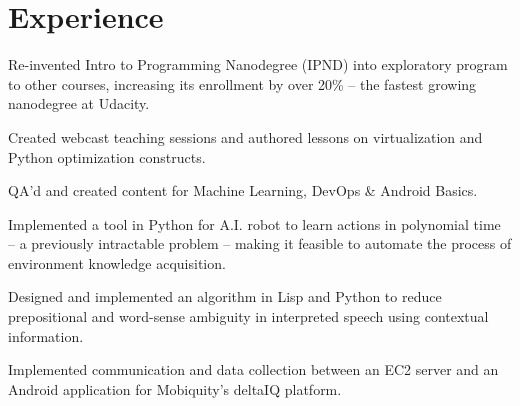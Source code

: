 \documentclass[]{deedy-resume-openfont}
\begin{document}
\hfill
\begin{minipage}[t]{0.66\textwidth} 


\section{Experience}

\vspace{\topsep} %
\begin{tightemize}

\item Re-invented Intro to Programming Nanodegree (IPND) into exploratory program to other courses, increasing its enrollment by over 20\% -- the fastest growing nanodegree at Udacity.

\item Created webcast teaching sessions and authored lessons on virtualization and Python optimization constructs.

\item QA'd and created content for Machine Learning, DevOps \& Android Basics.

\end{tightemize}
\sectionsep

\begin{tightemize}
\item Implemented a tool in Python for A.I. robot to learn actions in polynomial time -- a previously intractable problem -- making it feasible to automate the process of environment knowledge acquisition.

\item Designed and implemented an algorithm in Lisp and Python to reduce prepositional and word-sense ambiguity in interpreted speech using contextual information.
\end{tightemize}
\sectionsep

\begin{tightemize}
\item Implemented communication and data collection between an EC2 server and an Android application for Mobiquity’s deltaIQ platform.


\end{tightemize}
\end{minipage}
\end{document}
